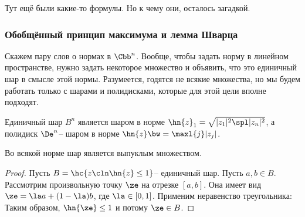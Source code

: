 \documentclass[a4paper]{article}
\begin{document}
\begin{petit}
Тут ещё были какие-то формулы. Но к чему они, осталось загадкой.
\end{petit}


\subsubsection{Обобщённый принцип максимума и лемма Шварца}

Скажем пару слов о нормах в $\Cbb^n$. Вообще, чтобы задать норму в линейном пространстве,
нужно задать некоторое множество и объявить, что это единичный шар в смысле этой нормы.
Разумеется, годятся не всякие множества, но мы будем работать только с шарами и полидисками,
которые для этой цели вполне подходят.

Единичный шар $B^n$ является шаром в норме $\hn{z}_1 = \sqrt{|z_1|^2\spl|z_n|^2}$, а
полидиск $\De^n$-- шаром в норме $\hn{z} \bw= \maxl{j} |z_j|$.

\begin{lemma}
Во всякой норме шар является выпуклым множеством.
\end{lemma}
\begin{proof}
Пусть $B = \hc{z\cln \hn{z} \le 1}$-- единичный шар. Пусть $a, b \in B$. Рассмотрим произвольную точку
$\ze$ на отрезке $[a,b]$. Она имеет вид $\ze = \la a + (1-\la) b$, где $\la \in [0,1]$.
Применим неравенство треугольника:
Таким образом, $\hn{\ze} \le 1$ и потому $\ze \in B$.
\end{proof}
\end{document}
